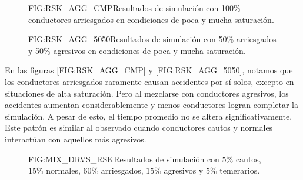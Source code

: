 \begin{figure}[Resultados para conductores Arriesgados]{FIG:RSK_AGG_CMP}{Resultados de simulación con 100\% conductores arriesgados en condiciones de poca y mucha saturación.}
     \hspace{1cm}
     \vspace{1cm}
\end{figure}

\begin{figure}[Resultados para conductores Arriesgados y Agresivos, conviviendo]{FIG:RSK_AGG_5050}{Resultados de simulación con 50\% arriesgados y 50\% agresivos en condiciones de poca y mucha saturación.}
     \hspace{1cm}
     \vspace{1cm}
\end{figure}

En las figuras \ref{FIG:RSK_AGG_CMP} y \ref{FIG:RSK_AGG_5050}, notamos que los conductores arriesgados raramente causan accidentes por sí solos, excepto en situaciones de alta saturación.
Pero al mezclarse con conductores agresivos, los accidentes aumentan considerablemente y menos conductores logran completar la simulación.
A pesar de esto, el tiempo promedio no se altera significativamente. Este patrón es similar al observado cuando conductores cautos y normales
interactúan con aquellos más agresivos.

\begin{figure}[Resultados para diferentes conductores, conviviendo]{FIG:MIX_DRVS_RSK}{Resultados de simulación con $5\%$ cautos, $15\%$ normales, $60\%$ arriesgados, $15\%$ agresivos y $5\%$ temerarios.}
     \hspace{1cm}
     \vspace{1cm}
\end{figure}

